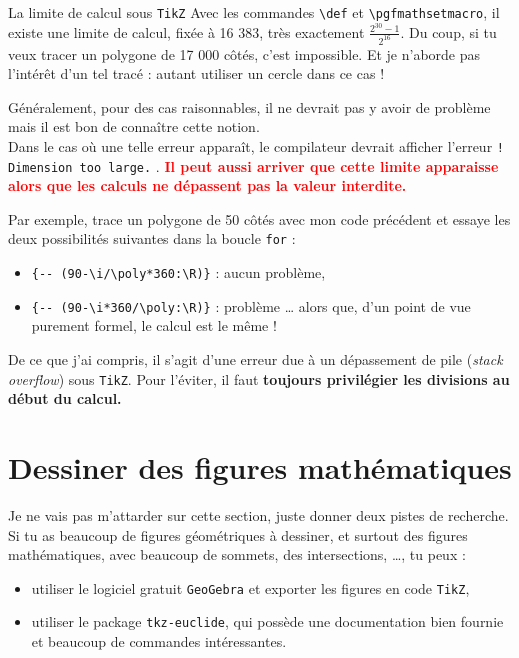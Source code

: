 \begin{attentionbox}{La limite de calcul sous \texttt{TikZ}}
Avec les commandes \verb?\def? et \verb?\pgfmathsetmacro?, il existe une limite de calcul, fixée à 16 383, très exactement $\frac{2^{30} - 1}{2^{16}}$. Du coup, si tu veux tracer un polygone de 17 000 côtés, c'est impossible. Et je n'aborde pas l'intérêt d'un tel tracé : autant utiliser un cercle dans ce cas !

Généralement, pour des cas raisonnables, il ne devrait pas y avoir de problème mais il est bon de connaître cette notion. \\

Dans le cas où une telle erreur apparaît, le compilateur devrait afficher l'erreur \og \verb?! Dimension too large.? \fg{}. \textcolor{Red}{\textbf{Il peut aussi arriver que cette limite apparaisse alors que les calculs ne dépassent pas la valeur interdite.}} 

Par exemple, trace un polygone de 50 côtés avec mon code précédent et essaye les deux possibilités suivantes dans la boucle \verb?for? :

\begin{itemize}[label = ]
\item \verb?{-- (90-\i/\poly*360:\R)}? : aucun problème,

\item \verb?{-- (90-\i*360/\poly:\R)}? : problème \dots{} alors que, d'un point de vue purement formel, le calcul est le même !
\end{itemize}

De ce que j'ai compris, il s'agit d'une erreur due à un dépassement de pile (\textit{stack overflow}) sous \texttt{TikZ}. Pour l'éviter, il faut \textbf{toujours privilégier les divisions au début du calcul.}
\end{attentionbox}

\section{Dessiner des figures mathématiques}

Je ne vais pas m'attarder sur cette section, juste donner deux pistes de recherche. Si tu as beaucoup de figures géométriques à dessiner, et surtout des figures mathématiques, avec beaucoup de sommets, des intersections, \dots{}, tu peux :

\begin{itemize}[label = ]
\item utiliser le logiciel gratuit \texttt{GeoGebra} et exporter les figures en code \texttt{TikZ},

\item utiliser le package \verb?tkz-euclide?, qui possède une documentation bien fournie et beaucoup de commandes intéressantes. \\
\end{itemize}

